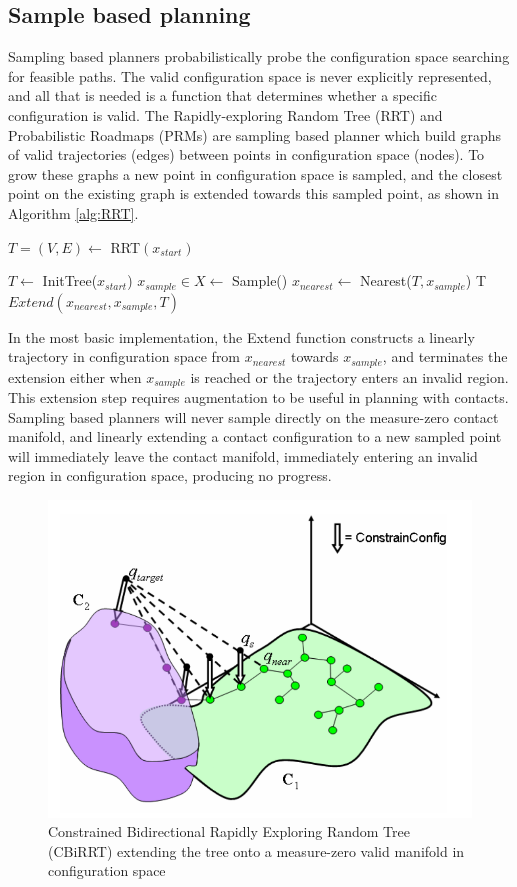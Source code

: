 \documentclass[../thesis.tex]{subfiles}
\begin{document}
\subsection{Sample based planning} \label{sec:related:RRT}
Sampling based planners probabilistically probe the configuration space searching for feasible paths.
The valid configuration space is never explicitly represented, and all that is needed is a function that determines whether a specific configuration is valid.
The Rapidly-exploring Random Tree (RRT) and Probabilistic Roadmaps (PRMs) are sampling based planner which build graphs of valid trajectories (edges) between points in configuration space (nodes).
To grow these graphs a new point in configuration space is sampled, and the closest point on the existing graph is extended towards this sampled point, as shown in Algorithm \ref{alg:RRT}. 
\cite{LaValle1998}

\begin{algorithm}
\caption{$T=(V,E) \leftarrow$ RRT$(x_{start})$}\label{alg:RRT}
\begin{algorithmic}[1]
\State $T \leftarrow$ InitTree($x_{start}$)
\State $x_{sample} \in X \leftarrow$ Sample()
\State $x_{nearest} \leftarrow $ Nearest($T, x_{sample}$)
\State T \leftarrow $Extend(x_{nearest}, x_{sample}, T)$
\EndWhile
\end{algorithmic}
\end{algorithm}

In the most basic implementation, the Extend function constructs a linearly trajectory in configuration space from $x_{nearest}$ towards $x_{sample}$, and terminates the extension either when $x_{sample}$ is reached or the trajectory enters an invalid region. \cite{LaValle1998}
This extension step requires augmentation to be useful in planning with contacts.
Sampling based planners will never sample directly on the measure-zero contact manifold, and linearly extending a contact configuration to a new sampled point will immediately leave the contact manifold, immediately entering an invalid region in configuration space, producing no progress.

\begin{figure}
  \centering
  \includegraphics[width=.5\linewidth]{./RelatedWork/CBiRRT.png}
  \caption{Constrained Bidirectional Rapidly Exploring Random Tree (CBiRRT) extending the tree onto a measure-zero valid manifold in configuration space}
  \label{fig:CiBRRT}
\end{figure}
\end{document}
